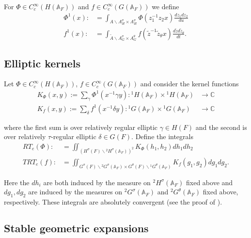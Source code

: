 \documentclass[12pt]{amsart}
\theoremstyle{remark}
\numberwithin{equation}{section}
\newcommand{\A}{\mathbb{A}}
\newcommand{\lto}{\longrightarrow}
\newcommand{\CC}{\mathbb{C}}
\theoremstyle{definition}
\numberwithin{equation}{subsection}
\begin{document}
For $\Phi \in C_c^{\infty}(H(\A_F))$ and $f \in C_c^{\infty}(G(\A_F))$ we define
\begin{align} \label{fones}
\Phi^1(x):& = \int_{A \backslash A_{H}^{\sigma} \times A_{H}^{\sigma}} \Phi(z_1^{-1}z_2x) \frac{dz_1dz_2}{du}\\
\nonumber f^1(x):&= \int_{\widetilde{A} \backslash A_{G}^{\sigma} \times A_{G}^{\theta}} f(\widetilde{z}^{-1} \widetilde{z}_{\theta}x) \frac{d\widetilde{z}d\widetilde{z}_{\theta}}{dt}.
\end{align}  



\subsection{Elliptic kernels}

Let $\Phi \in C_c^{\infty}(H(\A_F))$, $f \in C_c^{\infty}(G(\A_F))$ and consider the kernel functions
\begin{align*}
K_{\Phi}(x,y):=\sum_{\gamma} \Phi^1(x^{-1} \gamma y) :{}^1H(\A_F) \times {}^1H(\A_F) &\lto \CC\\
K_{f}(x,y):=\sum_{\delta} f^1(x^{-1} \delta y):{}^1G(\A_F) \times {}^1G(\A_F)
&\lto \CC
\end{align*}
 

\noindent
where the first sum is over relatively regular elliptic $\gamma \in H(F)$ and the second is over
 relatively $\tau$-regular elliptic $\delta \in G(F)$.   Define the integrals
\begin{align*}
RT_e(\Phi):&=\iint_{(H^{\sigma}(F) \backslash {}^{2}H^{\sigma}(\A_F))^2} K_{\Phi}(h_1,h_2) dh_1 dh_2\\
TRT_e(f):&=\iint_{G^{\sigma}(F) \backslash {}^{2}G^{\sigma}(\A_F) \times G^{\theta}(F) \backslash
{}^{1}G^{\theta}(\A_F)}K_{f}(g_1,g_2)dg_1 dg_2.
\end{align*}  

\noindent
Here the $dh_i$ are both induced by the measure on $ {}^{2}H^{\sigma}(\A_F)$ fixed above
and $dg_1,dg_2$ are induced by the measures on  ${}^{2}G^{\sigma}(\A_F)$ and ${}^{2}G^{\theta}(\A_F)$ fixed above, respectively. These integrals are absolutely convergent (see the proof of \cite[Theorem 4.1]{Hahn}).


\subsection{Stable geometric expansions} \label{ssec-st-geom-exp}
\end{document}
